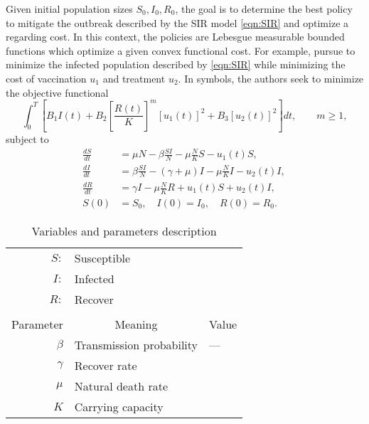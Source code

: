 Given initial population sizes $S_0, I_0, R_0$, the goal is to determine the best policy to
mitigate the outbreak described by the SIR model \eqref{eqn:SIR} and optimize a regarding  cost. In this context, the policies are Lebesgue measurable bounded functions
which optimize a given convex functional cost. For example, \citeauthor{Schaefer2009} pursue to minimize the infected population described by \eqref{eqn:SIR} while minimizing the cost of vaccination $u_1$ and treatment $u_2$. In symbols, the authors seek to minimize the objective functional
\begin{equation}
	\int_{0}^T	
		\left[
			B_1 I(t) 
			+ B_2 \left[\frac{R(t)}{K}\right]^m [u_1(t)]^2 + B_3 [u_2(t)]^2
		\right] dt,
		\qquad  m\geq 1,
\end{equation}
subject to
\begin{equation}
	\begin{aligned}
		\frac{dS}{dt} &=
			\mu N  
			- \beta \frac{S I}{N} 
			- \mu \frac{N}{K} S - u_1(t) S,
		\\
		\frac{dI}{dt} &=
			\beta \frac{S I}{N}
			- (\gamma  + \mu) I 
			- \mu \frac{N}{K} I
			- u_2(t) I,
		\\
		\frac{dR}{dt} &= 
			\gamma I 
			- \mu \frac{N}{K} R 
			+ u_1(t) S 
			+ u_2(t) I,
		\\
		S(0) &= S_0, \quad
		I(0) = I_0, \quad
		R(0) = R_0. \quad
	\end{aligned}
\end{equation}
\begin{table}
	\begin{center}
		\begin{tabular}{@{}rll@{}} 
			$S:$
      
			&
				Susceptible
			\\
			$I:$ 
			&	Infected
			\\
			$R:$ 
			&	Recover
			\\
			\\
			\multicolumn{1}{c}{Parameter}
			&
			\multicolumn{1}{c}{Meaning}
			& 
			\multicolumn{1}{c}{Value}
			\\
				\midrule
				$\beta$
				& 
					Transmission probability
				&
					---
			\\
				$\gamma$
				&
					Recover rate
			\\
				$\mu$
				&
					Natural death rate
			\\
				$K$
				&
					Carrying capacity
			\\
			\bottomrule
		\end{tabular}
		\caption{Variables and parameters description}
	\end{center}
\end{table}
